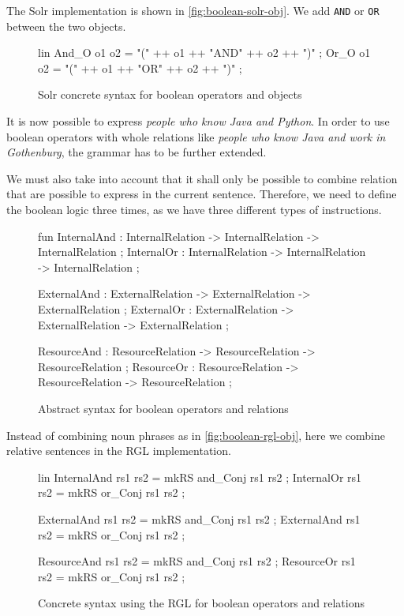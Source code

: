 The Solr implementation is shown in \autoref{fig:boolean-solr-obj}. We add \texttt{AND} or \texttt{OR} between the two objects.

\begin{figure}[H]
\begin{code}
lin
  And_O o1 o2 = "(" ++ o1 ++ "AND" ++ o2 ++ ")" ;
  Or_O o1 o2 = "(" ++ o1 ++ "OR" ++ o2 ++ ")" ;
\end{code}
\caption{Solr concrete syntax for boolean operators and objects\label{fig:boolean-solr-obj}}
\end{figure}

It is now possible to express \emph{people who know Java and Python}. In order to use boolean operators with whole relations like \emph{people who know Java and work in Gothenburg}, the grammar has to be further extended.

We must also take into account that it shall only be possible to combine relation that are possible to express in the current sentence. Therefore, we need to define the boolean logic three times, as we have three different types of instructions.

\begin{figure}[H]
\begin{code}
fun
  InternalAnd : InternalRelation -> InternalRelation -> InternalRelation ;
  InternalOr : InternalRelation -> InternalRelation -> InternalRelation ;

  ExternalAnd : ExternalRelation -> ExternalRelation -> ExternalRelation ;
  ExternalOr : ExternalRelation -> ExternalRelation -> ExternalRelation ;
 	  
  ResourceAnd : ResourceRelation -> ResourceRelation -> ResourceRelation ;
  ResourceOr : ResourceRelation -> ResourceRelation -> ResourceRelation ;
\end{code}
\caption{Abstract syntax for boolean operators and relations\label{fig:boolean-abstract-relations}}
\end{figure}

Instead of combining noun phrases as in \autoref{fig:boolean-rgl-obj}, here we combine relative sentences in the RGL implementation.

\begin{figure}[H]
\begin{code}
lin
  InternalAnd rs1 rs2 = mkRS and_Conj rs1 rs2 ;
  InternalOr rs1 rs2 = mkRS or_Conj rs1 rs2 ;
	  
  ExternalAnd rs1 rs2 = mkRS and_Conj rs1 rs2 ;
  ExternalAnd rs1 rs2 = mkRS or_Conj rs1 rs2 ;
	  
  ResourceAnd rs1 rs2 = mkRS and_Conj rs1 rs2 ;
  ResourceOr rs1 rs2 = mkRS or_Conj rs1 rs2 ;
\end{code}
\caption{Concrete syntax using the RGL for boolean operators and relations\label{fig:boolean-rgl-relations}}
\end{figure}

